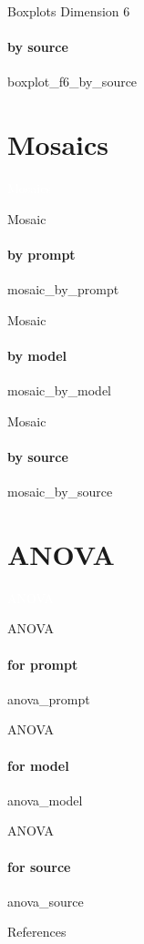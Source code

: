 {\nologo
\begin{frame}{Boxplots Dimension 6}
    \framesubtitle{by source}
    {boxplot_f6_by_source}
\end{frame}
}

\section{Mosaics}

{\nologo
{}
\begin{frame}[c,plain]{}
    \vspace*{1cm}
    \centering
    \Huge
    \textcolor{white}{Mosaics}
\end{frame}
}

{\nologo
\begin{frame}{Mosaic}
    \framesubtitle{by prompt}
    {mosaic_by_prompt}
\end{frame}
}

{\nologo
\begin{frame}{Mosaic}
    \framesubtitle{by model}
    {mosaic_by_model}
\end{frame}
}

{\nologo
\begin{frame}{Mosaic}
    \framesubtitle{by source}
    {mosaic_by_source}
\end{frame}
}

\section{ANOVA}

{\nologo
{}
\begin{frame}[c,plain]{}
    \vspace*{1cm}
    \centering
    \Huge
    \textcolor{white}{ANOVA}
\end{frame}
}

{\nologo
\begin{frame}{ANOVA}
    \framesubtitle{for prompt}
    {anova_prompt}
\end{frame}
}

{\nologo
\begin{frame}{ANOVA}
    \framesubtitle{for model}
    {anova_model}
\end{frame}
}

{\nologo
\begin{frame}{ANOVA}
    \framesubtitle{for source}
    {anova_source}
\end{frame}
}

\appendix

{\nologo
\begin{frame}[allowframebreaks]{References}
    \printbibliography
\end{frame}
}
